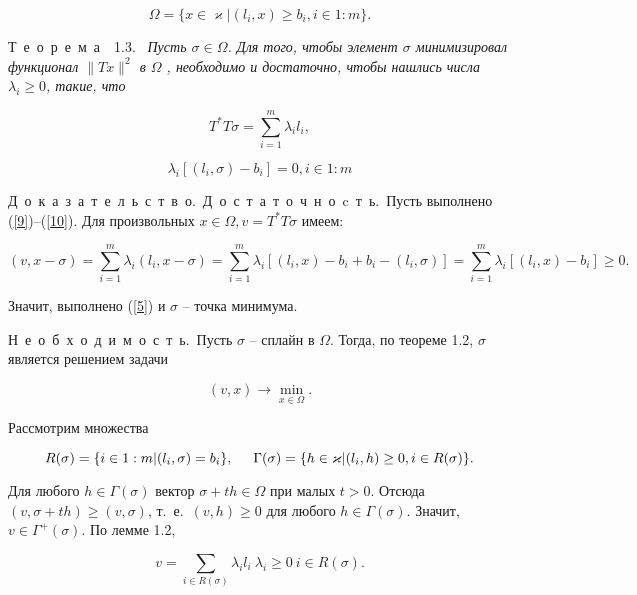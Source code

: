 \documentclass{book}
\newcommand{\idest}{т.~е.\ }
\newcommand{\theorem}[1]{Т~е~о~р~е~м~а~~#1.\ }
\newcommand{\nec}{Н~е~о~б~х~о~д~и~м~о~с~т~ь.\ }
\newcommand{\suff}{Д~о~с~т~а~т~о~ч~н~о~c~т~ь.\ }
\newcommand{\proof}{Д~о~к~а~з~а~т~е~л~ь~с~т~в~о.\ }
\begin{document}
\begin{equation*}
\Omega=\{x\in\varkappa|(l_i,x)\geq b_i,i\in1:m\}.
\end{equation*}

\par\theorem{1.3} \textit{Пусть $\sigma\in\Omega$. Для того, чтобы элемент $\sigma$ минимизировал функционал $\|Tx\|^2$ в $\Omega$ , необходимо и достаточно, чтобы нашлись числа $\lambda_i\geq0$, такие, что}

\begin{equation}
T^*T\sigma=\sum_{i=1}^m\lambda_il_i,
\label{9}
\end{equation}

\begin{equation}
\lambda_i[(l_i, \sigma)-b_i]=0, i\in1:m
\label{10}
\end{equation}

\par\proof\suff Пусть выполнено (\ref{9})--(\ref{10}). Для произвольных $x\in\Omega, v=T^*T\sigma$ имеем:

\begin{equation*}
(v, x-\sigma)=\sum_{i=1}^m\lambda_i(l_i, x-\sigma)=\sum_{i=1}^m\lambda_i[(l_i,x)-b_i+b_i-(l_i, \sigma)]=\sum_{i=1}^m\lambda_i[(l_i,x)-b_i]\geq0.
\end{equation*}

\noindent Значит, выполнено (\ref{5}) и $\sigma$ -- точка минимума.
\par\nec Пусть $\sigma$ -- сплайн в $\Omega$. Тогда, по теореме 1.2, $\sigma$ является решением задачи

\begin{equation*}
(v, x)\rightarrow\min_{x\in\Omega}.
\end{equation*}

\noindent Рассмотрим множества

\begin{equation*}
R(\sigma)=\{i\in1:m|(l_i, \sigma)=b_i\},\hspace{5mm}\Gamma(\sigma)=\{h\in\varkappa|(l_i, h)\geq0, i\in R(\sigma)\}.
\end{equation*}

\noindent Для любого $h\in\Gamma(\sigma)$ вектор $\sigma+th\in\Omega$ при малых $t>0$. Отсюда $(v, \sigma+th)\geq(v, \sigma)$, \idest $(v, h)\geq0$ для любого $h\in\Gamma(\sigma)$. Значит, $v\in\Gamma^+(\sigma)$. По лемме 1.2,

\begin{equation*}
v=\sum_{i\in R(\sigma)}\lambda_il_i\ \lambda_i\geq0\ i\in R(\sigma).
\end{equation*}
\end{document}

